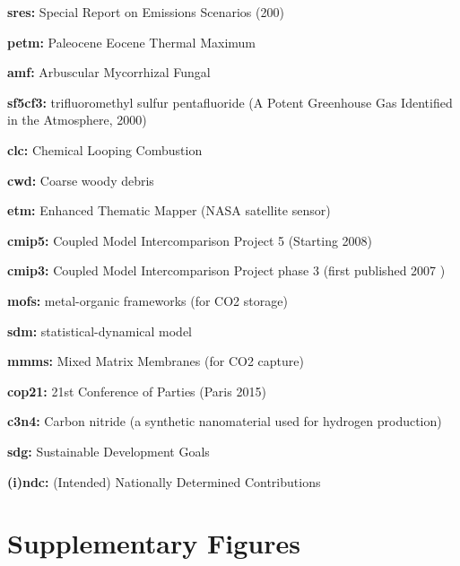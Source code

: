 \documentclass{article}
\begin{document}
\begin{linenumbers}
		\noindent\textbf{sres:} Special Report on Emissions Scenarios (200)
		
		\noindent\textbf{petm:} Paleocene Eocene Thermal Maximum
		
		\noindent\textbf{amf:}  Arbuscular Mycorrhizal Fungal
		
		\noindent\textbf{sf5cf3:} trifluoromethyl sulfur pentafluoride (A Potent Greenhouse Gas Identified in the Atmosphere, 2000)
		
		\noindent\textbf{clc:} Chemical Looping Combustion
		
		\noindent\textbf{cwd:} Coarse woody debris
		
		\noindent\textbf{etm:} Enhanced Thematic Mapper (NASA satellite sensor)
		
		\noindent\textbf{cmip5:} Coupled Model Intercomparison Project 5 (Starting 2008)
		
		\noindent\textbf{cmip3:} Coupled Model Intercomparison Project phase 3 (first published 2007 \cite{Meehl2007})
		
		\noindent\textbf{mofs:} metal-organic frameworks (for CO2 storage)
		
		\noindent\textbf{sdm:} statistical-dynamical model
		
		\noindent\textbf{mmms:} Mixed Matrix Membranes (for CO2 capture)
		
		\noindent\textbf{cop21:} 21st Conference of Parties (Paris 2015) 
		
		\noindent\textbf{c3n4:} Carbon nitride (a synthetic nanomaterial used for hydrogen production)
		
		\noindent\textbf{sdg:} Sustainable Development Goals
		
		\noindent\textbf{(i)ndc:} (Intended) Nationally Determined Contributions
		
		
	\end{linenumbers}
	
	\linespread{1}
	

	
	\section*{Supplementary Figures}
	
			\setcounter{figure}{0}
	\renewcommand\thefigure{SI.\arabic{figure}}  
	
\end{document}
